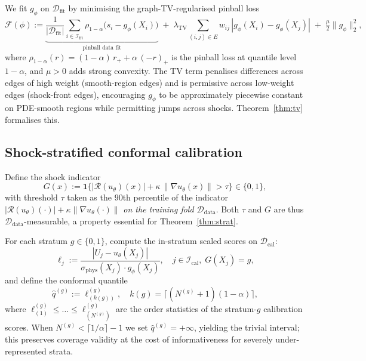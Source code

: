 \documentclass[11pt]{article}
\theoremstyle{definition}
\theoremstyle{remark}
\newcommand{\Ddata}{\mathcal{D}_{\text{data}}}
\newcommand{\Dfit}{\mathcal{D}_{\text{fit}}}
\newcommand{\Dcal}{\mathcal{D}_{\text{cal}}}
\newcommand{\sphys}{\sigma_{\mathrm{phys}}}
\newcommand{\TV}{\mathrm{TV}}
\newcommand{\Rop}{\mathcal{R}}
\newcommand{\ind}{\mathbf{1}}
\begin{document}
We fit $g_\phi$ on $\Dfit$ by minimising the graph-TV-regularised pinball loss
\begin{equation}
    \mathcal{F}(\phi) :=
    \underbrace{\frac{1}{|\Dfit|}\sum_{i \in \mathcal{I}_{\text{fit}}} \rho_{1-\alpha}\!\big(s_i - g_\phi(X_i)\big)}_{\text{pinball data fit}}
    \;+\; \lambda_{\TV}\!\!\!\!\sum_{(i,j)\in E}\!\!\!\! w_{ij}\,|g_\phi(X_i) - g_\phi(X_j)|
    \;+\; \tfrac{\mu}{2} \|g_\phi\|_2^2,
    \label{eq:gphi-loss}
\end{equation}
where $\rho_{1-\alpha}(r) = (1{-}\alpha)\, r_+ + \alpha\, (-r)_+$ is the pinball loss at quantile level $1{-}\alpha$, and $\mu > 0$ adds strong convexity. The TV term penalises differences across edges of high weight (smooth-region edges) and is permissive across low-weight edges (shock-front edges), encouraging $g_\phi$ to be approximately piecewise constant on PDE-smooth regions while permitting jumps across shocks. Theorem~\ref{thm:tv} formalises this.

\subsection{Shock-stratified conformal calibration}
\label{sec:stratify}

Define the shock indicator
\begin{equation}
    G(x) := \ind\big\{|\Rop(u_\theta)(x)| + \kappa\,\|\nabla u_\theta(x)\| > \tau\big\} \in \{0, 1\},
    \label{eq:strat}
\end{equation}
with threshold $\tau$ taken as the $90$th percentile of the indicator $|\Rop(u_\theta)(\cdot)| + \kappa\|\nabla u_\theta(\cdot)\|$ \emph{on the training fold $\Ddata$}. Both $\tau$ and $G$ are thus $\Ddata$-measurable, a property essential for Theorem~\ref{thm:strat}.

For each stratum $g \in \{0, 1\}$, compute the in-stratum scaled scores on $\Dcal$:
\begin{equation}
    \ell_j := \frac{|U_j - u_\theta(X_j)|}{\sphys(X_j) \cdot g_\phi(X_j)},
    \quad j \in \mathcal{I}_{\text{cal}},\; G(X_j) = g,
    \label{eq:loc-score}
\end{equation}
and define the conformal quantile
\begin{equation}
    \hat{q}^{(g)} := \ell^{(g)}_{(k(g))},
    \quad
    k(g) = \lceil (N^{(g)} + 1)(1 - \alpha) \rceil,
    \label{eq:qhat}
\end{equation}
where $\ell^{(g)}_{(1)} \leq \dots \leq \ell^{(g)}_{(N^{(g)})}$ are the order statistics of the stratum-$g$ calibration scores. When $N^{(g)} < \lceil 1/\alpha \rceil - 1$ we set $\hat{q}^{(g)} = +\infty$, yielding the trivial interval; this preserves coverage validity at the cost of informativeness for severely under-represented strata.
\end{document}
